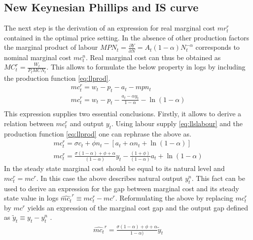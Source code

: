 \documentclass[12pt,a4paper,english]{article} %
\begin{document}
	\subsection{New Keynesian Phillips and IS curve} \label{nk_nkp_is}
	The next step is the derivation of an expression for real marginal cost $mr_{t}^r$ contained in the optimal price setting. In the absence of other production factors the marginal product of labour $MPN_t = \frac{\partial Y}{\partial N} = A_t (1- \alpha) N_t^{-\alpha}$ corresponds to nominal marginal cost $mc_t^n$. Real marginal cost can thus be obtained as $MC_t^r = \frac{W_t}{P_t MCN_t}$. This allows to formulate the below property in logs by including the production function \eqref{eq:llprod}.
	\begin{equation} \label{eq:26}
		\begin{aligned}
			mc_t^r = w_t - p_t - a_t - mpn_t \\
			mc_t^r = w_t - p_t - \frac{a_t - \alpha y_t}{1 - \alpha} - \ln(1 - \alpha) \\
		\end{aligned}
	\end{equation}
	This expression supplies two essential conclusions. 
	Firstly, it allows to derive a relation between $mc_t^r$ and output $y_t$. Using labour supply \eqref{eq:llslabour} and the production function \eqref{eq:llprod} one can rephrase the above as. 
	\begin{equation}
		\begin{aligned}
			mc_t^r = \sigma c_t + \phi n_t - [a_t + \alpha n_t + \ln(1-\alpha)] \\
			mc_t^r = 
			\frac{
				\sigma (1 - \alpha) + \phi + \alpha
			}{
				(1 - \alpha)	
			}	 y_t
			- \frac{
				(1 + \phi)	
			}{
				(1 - \alpha)	
			} a_t
			+ \ln(1-\alpha)
		\end{aligned}
	\end{equation}
	In the steady state marginal cost should be equal to its natural level and $mc_t^r = mc^r$. In this case the above describes natural output $y_t^n$. This fact can be used to derive an expression for the gap between marginal cost and its steady state value in logs $\hat{mc_t}^r \equiv mc_t^r - mc^r$. Reformulating the above by replacing $mc_t^r$ by $mc^r$ yields an expression of the marginal cost gap and the output gap defined as $\tilde{y}_t \equiv y_t - y_t^n$ . 
	\begin{equation} \label{eq:llmcrhat}
		\begin{aligned}
			\hat{mc_t}^r = \frac{\sigma (1 - \alpha) + \phi + \alpha}
			{1 - \alpha)} \tilde{y}_t
		\end{aligned}
	\end{equation}
\end{document}
